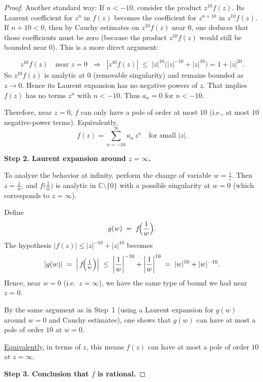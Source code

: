 \documentclass[12pt]{article}
\theoremstyle{definition} %
\theoremstyle{plain} %
\begin{document}
\begin{proof}
Another standard way: If $n < -10$, consider the product $z^{10}f(z)$. Its Laurent coefficient for $z^n$ in $f(z)$ becomes the coefficient for $z^{n+10}$ in $z^{10}f(z)$. If $n+10 < 0$, then by Cauchy estimates on $z^{10}f(z)$ near $0$, one deduces that those coefficients must be zero (because the product $z^{10} f(z)$ would still be bounded near $0$). This is a more direct argument:

\[
z^{10} f(z) \quad \text{near } z=0 \;\; \Longrightarrow \;\; 
|z^{10} f(z)| \;\le\; |z|^{10} \bigl(|z|^{-10} + |z|^{10}\bigr) = 1 + |z|^{20}.
\]
So $z^{10} f(z)$ is analytic at $0$ (removable singularity) and remains bounded as $z\to 0$. Hence its Laurent expansion has no negative powers of $z$. That implies $f(z)$ has no terms $z^n$ with $n < -10$. Thus $a_n=0$ for $n < -10$.

\medskip

\noindent
Therefore, near $z=0$, $f$ can only have a pole of order at most $10$ (i.e., at most $10$ negative-power terms). Equivalently,
\[
f(z) = \sum_{n=-10}^{\infty} a_n \, z^n
\quad\text{for small }|z|.
\]

\bigskip

\noindent
\textbf{Step 2. Laurent expansion around $z=\infty$.}

To analyze the behavior at infinity, perform the change of variable $w = \frac{1}{z}$. Then $z = \frac{1}{w}$, and $f\bigl(\tfrac{1}{w}\bigr)$ is analytic in $\mathbb{C}\setminus\{0\}$ with a possible singularity at $w=0$ (which corresponds to $z=\infty$).

Define
\[
g(w) \;=\; f\!\Bigl(\frac{1}{w}\Bigr).
\]
The hypothesis $|f(z)| \le |z|^{-10} + |z|^{10}$ becomes
\[
|g(w)| 
\;=\;
\left|\,f\!\Bigl(\tfrac{1}{w}\Bigr)\right|
\;\le\;
\left|\frac{1}{w}\right|^{-10} + \left|\frac{1}{w}\right|^{10}
\;=\;
|w|^{10} + |w|^{-10}.
\]
Hence, near $w=0$ (i.e.\ $z=\infty$), we have the same type of bound we had near $z=0$.

\medskip

By the same argument as in Step~1 (using a Laurent expansion for $g(w)$ around $w=0$ and Cauchy estimates), one shows that $g(w)$ can have at most a pole of order $10$ at $w=0$. 

\smallskip

\noindent
\underline{Equivalently}, in terms of $z$, this means $f(z)$ can have at most a pole of order $10$ at $z=\infty$. 

\bigskip

\noindent
\textbf{Step 3. Conclusion that $f$ is rational.}


\end{proof}
\end{document}
